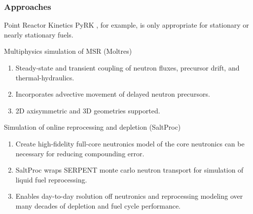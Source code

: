 \begin{frame}
  \frametitle{Approaches}
                  \vspace*{-0.1in}
              \begin{block}{Point Reactor Kinetics}
                      PyRK \cite{huff_pyrk:_2015}, for example, is only appropriate for stationary or nearly stationary fuels.
              \end{block}

              \begin{block}{Multiphysics simulation of \gls{MSR} (Moltres)\cite{lindsay_introduction_2018}}
               \begin{enumerate}
                \item Steady-state and transient coupling of neutron fluxes, 
                        precursor drift, and thermal-hydraulics.
                \item Incorporates advective movement of delayed neutron precursors.
                \item 2D axisymmetric and 3D geometries supported.
               \end{enumerate}
               \end{block}

              \begin{block}{Simulation of online reprocessing and depletion 
                      (SaltProc)\cite{rykhlevskii_arfc/saltproc:_2018,rykhlevskii_online_2017}}
               \begin{enumerate}
                \item Create high-fidelity full-core neutronics model of the 
                        core neutronics can be necessary for reducing 
                               compounding error.
                \item SaltProc wraps SERPENT monte carlo neutron transport for 
                        simulation of liquid fuel reprocessing.
                \item Enables day-to-day rsolution off neutronics and reprocessing modeling 
                        over many decades of depletion and fuel cycle performance.
               \end{enumerate}
               \end{block}


\end{frame}
